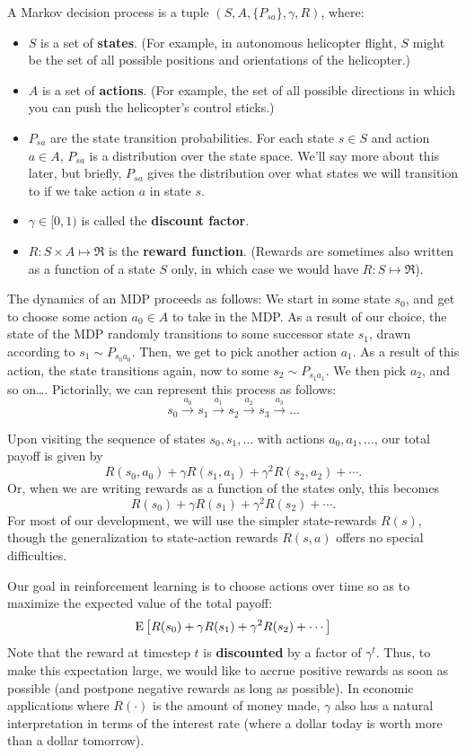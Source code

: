 \documentclass{article}
\begin{document}
A Markov decision process is a tuple $(S,A, \{P_{sa}\}, \gamma, R)$, where:
\begin{itemize}
\item $S$ is a set of {\bf states}.  (For example, in autonomous helicopter flight,
$S$ might be the set of all possible positions and orientations of the helicopter.)
\item $A$ is a set of {\bf actions}. (For example, the set of all possible directions
in which you can push the helicopter's control sticks.)
\item $P_{sa}$ are the state transition probabilities.  For each state
$s\in S$ and action $a \in A$, $P_{sa}$ is a distribution over the state space.
We'll say more about this later, but briefly, $P_{sa}$ gives the
distribution over what states we will transition to if we take
action $a$ in state $s$.
\item $\gamma \in [0, 1)$ is called the {\bf discount factor}.
\item $R : S \times A \mapsto \Re$ is the {\bf reward function}.
(Rewards are sometimes also written as a function of a state $S$ only, in
which case we would have $R : S \mapsto \Re$).
\end{itemize}

The dynamics of an MDP proceeds as follows:
We start in some state $s_0$, and get to choose some action $a_0 \in A$ to take
in the MDP.  As a result of our choice, the state of the MDP
randomly transitions to some successor state $s_1$, drawn according
to $s_1 \sim P_{s_0a_0}$.  Then, we get to pick another action $a_1$.
As a result of this action, the state transitions again, now to
some $s_2 \sim P_{s_1a_1}$.  We then pick $a_2$, and so on\ldots.  Pictorially,
we can represent this process as follows:
\[
s_0 \stackrel{a_0}{\longrightarrow} s_1
\stackrel{a_1}{\longrightarrow} s_2
\stackrel{a_2}{\longrightarrow} s_3
\stackrel{a_3}{\longrightarrow} \ldots
\]

Upon visiting the sequence of states $s_0, s_1, \ldots$ with actions $a_0, a_1, \ldots$,
our total payoff is given by
\[
R(s_0, a_0) + \gamma R(s_1, a_1) + \gamma^2 R(s_2, a_2) + \cdots.
\]
Or, when we are writing rewards as a function of the states only, this becomes
\[
R(s_0) + \gamma R(s_1) + \gamma^2 R(s_2) + \cdots.
\]
For most of our development, we will use the simpler state-rewards $R(s)$, though
the generalization to state-action rewards $R(s,a)$ offers no special difficulties.

Our goal in reinforcement learning is to choose actions over time so as
to maximize the expected value of the total payoff:
\[
{\rm E}\left[R(s_0) + \gamma R(s_1) + \gamma^2 R(s_2) + \cdots\right]
\]
Note that the reward at timestep $t$ is {\bf discounted} by a factor of $\gamma^t$.
Thus, to make this expectation large, we would like to accrue positive rewards
as soon as possible (and postpone negative rewards as long as possible).  In
economic applications where $R(\cdot)$ is the amount of money made, $\gamma$ also has
a natural interpretation in terms of the interest rate (where a dollar today is
worth more than a dollar tomorrow).
\end{document}
